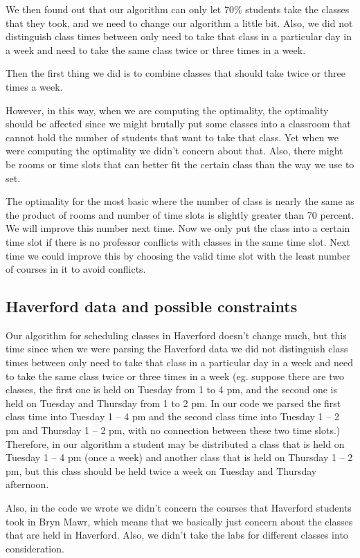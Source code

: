 \documentclass[11pt, oneside]{article}   	%
\begin{document}
We then found out that our algorithm can only let 70\% students take the classes that they took, and we need to change our algorithm a little bit. Also, we did not distinguish class times between only need to take that class in a particular day in a week and need to take the same class twice or three times in a week. 

Then the first thing we did is to combine classes that should take twice or three times a week. 

However, in this way, when we are computing the optimality, the optimality should be affected since we might brutally put some classes into a classroom that cannot hold the number of students that want to take that class. Yet when we were computing the optimality we didn't concern about that. Also, there might be rooms or time slots that can better fit the certain class than the way we use to set.

The optimality for the most basic where the number of class is nearly the same as the product of rooms and number of time slots is slightly greater than 70 percent. We will improve this number next time. Now we only put the class into a certain time slot if there is no professor conflicts with classes in the same time slot. Next time we could improve this by choosing the valid time slot with the least number of courses in it to avoid conflicts.

\subsection{Haverford data and possible constraints}
Our algorithm for scheduling classes in Haverford doesn't change much, but this time since when we were parsing the Haverford data we did not distinguish class times between only need to take that class in a particular day in a week and need to take the same class twice or three times in a week (eg. suppose there are two classes, the first one is held on Tuesday from 1 to 4 pm, and the second one is held on Tuesday and Thursday from 1 to 2 pm. In our code we parsed the first class time into Tuesday 1 -- 4 pm and the second class time into Tuesday 1 -- 2 pm and Thursday 1 -- 2 pm, with no connection between these two time slots.) Therefore, in our algorithm a student may be distributed a class that is held on Tuesday 1 -- 4 pm (once a week) and another class that is held on Thursday 1 -- 2 pm, but this class should be held twice a week on Tuesday and Thursday afternoon.

Also, in the code we wrote we didn't concern the courses that Haverford students took in Bryn Mawr, which means that we basically just concern about the classes that are held in Haverford. Also, we didn't take the labs for different classes into consideration.
\end{document}
